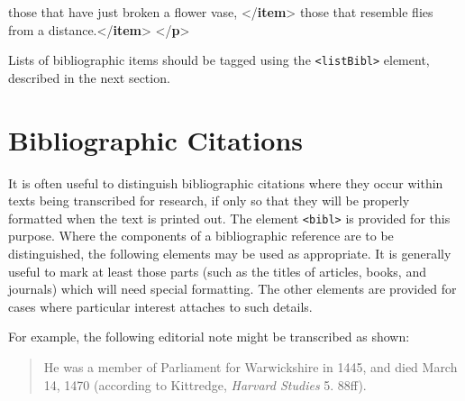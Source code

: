 \documentclass[11pt,twoside]{article}\makeatletter
\makeatletter
\renewcommand\section{\@startsection {section}{1}{\z@}%
     {-1.75ex \@plus -0.5ex \@minus -.2ex}%
     {0.5ex \@plus .2ex}%
     {\reset@font\Large\bfseries\sffamily}}
\def\DivI{\section}
\def\DivI{\chapter}
\makeatother
\begin{document}
\begin{shaded}
\hspace*{6pt} those that have just broken a flower\mbox{}\newline 
\hspace*{6pt}\hspace*{6pt}\hspace*{6pt}\hspace*{6pt} vase, {</\textbf{item}>}\mbox{}\newline 
\hspace*{6pt} those that resemble flies from a\mbox{}\newline 
\hspace*{6pt}\hspace*{6pt}\hspace*{6pt}\hspace*{6pt} distance.{</\textbf{item}>}\mbox{}\newline 
{}\mbox{}\newline 
{</\textbf{p}>}\end{shaded}\egroup\par \par
Lists of bibliographic items should be tagged using the \texttt{<listBibl>} element, described in the next section.
\DivI[Bibliographic Citations]{Bibliographic Citations}\label{U5-bibls}\par
It is often useful to distinguish bibliographic citations where they occur within texts being transcribed for research, if only so that they will be properly formatted when the text is printed out. The element \texttt{<bibl>} is provided for this purpose.  Where the components of a bibliographic reference are to be distinguished, the following elements may be used as appropriate. It is generally useful to mark at least those parts (such as the titles of articles, books, and journals) which will need special formatting.  The other elements are provided for cases where particular interest attaches to such details. \par
For example, the following editorial note might be transcribed as shown: 
\begin{quote}
He was a member of Parliament for Warwickshire in 1445, and died March 14, 1470 (according to Kittredge, \textit{Harvard Studies} 5. 88ff).\end{quote}
\end{document}
